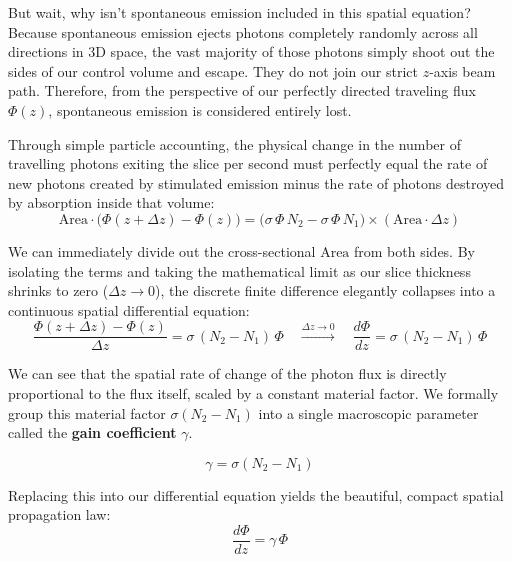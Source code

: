 But wait, why isn't spontaneous emission included in this spatial equation? Because spontaneous emission ejects photons completely randomly across all directions in 3D space, the vast majority of those photons simply shoot out the sides of our control volume and escape. They do not join our strict $z$-axis beam path. Therefore, from the perspective of our perfectly directed traveling flux $\Phi(z)$, spontaneous emission is considered entirely lost.

Through simple particle accounting, the physical change in the number of travelling photons exiting the slice per second must perfectly equal the rate of new photons created by stimulated emission minus the rate of photons destroyed by absorption inside that volume:
\begin{equation*}
    \text{Area} \cdot \big(\Phi(z + \Delta z) - \Phi(z)\big) = \big(\sigma\,\Phi\,N_2 - \sigma\,\Phi\,N_1\big) \times (\text{Area} \cdot \Delta z)
\end{equation*}

We can immediately divide out the cross-sectional $\text{Area}$ from both sides. By isolating the terms and taking the mathematical limit as our slice thickness shrinks to zero ($\Delta z \to 0$), the discrete finite difference elegantly collapses into a continuous spatial differential equation:
\begin{equation*}
    \frac{\Phi(z + \Delta z) - \Phi(z)}{\Delta z} = \sigma\,(N_2 - N_1)\,\Phi \quad \xrightarrow{\Delta z \to 0} \quad \frac{d\Phi}{dz} = \sigma\,(N_2 - N_1)\,\Phi
\end{equation*}

We can see that the spatial rate of change of the photon flux is directly proportional to the flux itself, scaled by a constant material factor. We formally group this material factor $\sigma(N_2 - N_1)$ into a single macroscopic parameter called the \textbf{gain coefficient} $\gamma$.

\begin{keyresult}
    \begin{equation}
        \gamma = \sigma(N_2 - N_1)
    \end{equation}
\end{keyresult}

Replacing this into our differential equation yields the beautiful, compact spatial propagation law:
\begin{equation*}
    \frac{d\Phi}{dz} = \gamma\,\Phi
\end{equation*}

